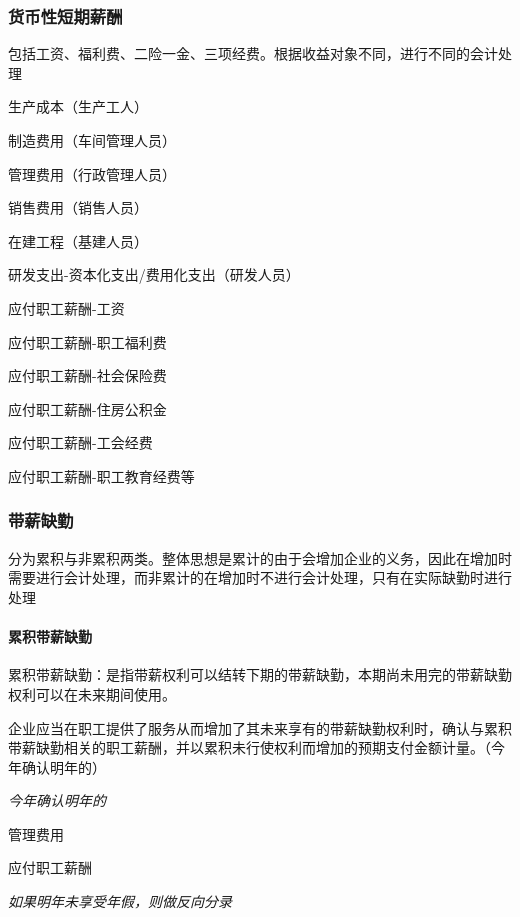\documentclass[UTF8,12pt]{ctexart}
\newenvironment{Dr}{%
	\begin{list}{}%
		{
			\setlength{\leftmargin}{2em}
			\setlength{\labelwidth}{2em}
			\setlength{\labelsep}{0pt}
			\setlength{\itemindent}{0pt}
			\setlength{\listparindent}{0pt}
			\setlength{\parsep}{0pt}
			\setlength{\topsep}{0pt}
		}
		\item[\textbf{借：}]
	}{%
	\end{list}
}
\newenvironment{Cr}{%
	\begin{list}{}%
		{
			\setlength{\leftmargin}{3em}
			\setlength{\labelwidth}{2em}
			\setlength{\labelsep}{0pt}
			\setlength{\itemindent}{0pt}
			\setlength{\listparindent}{0pt}
			\setlength{\parsep}{0pt}
			\setlength{\topsep}{0pt}
		}
		\item[\textbf{贷：}]
	}{%
	\end{list}
}
\numberwithin{equation}{section} %
\numberwithin{figure}{section}
\numberwithin{table}{section}
\begin{document}
	\subsubsection{货币性短期薪酬}
	包括工资、福利费、二险一金、三项经费。根据收益对象不同，进行不同的会计处理
	
	\begin{Dr}
		生产成本（生产工人）
		
		制造费用（车间管理人员）
		
		管理费用（行政管理人员）
		
		销售费用（销售人员）
		
		在建工程（基建人员）
		
		研发支出-资本化支出/费用化支出（研发人员）
	\end{Dr}
	\begin{Cr}
		应付职工薪酬-工资
		
		应付职工薪酬-职工福利费
		
		应付职工薪酬-社会保险费
		
		应付职工薪酬-住房公积金
		
		应付职工薪酬-工会经费
		
		应付职工薪酬-职工教育经费等
	\end{Cr}

	\subsubsection{带薪缺勤}
	
	分为累积与非累积两类。整体思想是累计的由于会增加企业的义务，因此在增加时需要进行会计处理，而非累计的在增加时不进行会计处理，只有在实际缺勤时进行处理
	
	\paragraph{累积带薪缺勤}累积带薪缺勤：是指带薪权利可以结转下期的带薪缺勤，本期尚未用完的带薪缺勤权利可以在未来期间使用。
	
	企业应当在职工提供了服务从而增加了其未来享有的带薪缺勤权利时，确认与累积带薪缺勤相关的职工薪酬，并以累积未行使权利而增加的预期支付金额计量。（今年确认明年的）
	
	\textit{今年确认明年的}
	
	\begin{Dr}
		管理费用
	\end{Dr}
	\begin{Cr}
		应付职工薪酬
	\end{Cr}

	\textit{如果明年未享受年假，则做反向分录}
	
\end{document}
